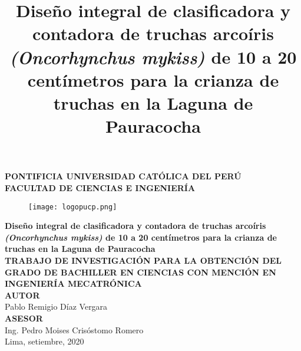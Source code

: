 \clearpage{\pagestyle{empty}\cleardoublepage}
\begin{titlepage}
\begin{center}
 {\Large \bf PONTIFICIA UNIVERSIDAD CATÓLICA DEL PERÚ}\\
  \vspace{0.8 cm} 
  {\Large \bf FACULTAD DE CIENCIAS E INGENIERÍA}\\
  \vspace{1.75 cm}
 \begin{figure}[H]
    \centering
    \texttt{[image: logopucp.png]}
\end{figure}
  \vspace{0.25cm}

\title{Diseño integral de clasificadora y contadora de truchas arcoíris \textit{(Oncorhynchus mykiss)} de 10 a 20 centímetros para la crianza de truchas en la Laguna de Pauracocha} %
{\Large \bf Diseño integral de clasificadora y contadora de truchas arcoíris \textit{(Oncorhynchus mykiss)} de 10 a 20 centímetros para la crianza de truchas en la Laguna de Pauracocha}\\ %
\vspace{0.5cm}
{\Large \bf TRABAJO DE INVESTIGACIÓN PARA LA OBTENCIÓN DEL GRADO DE BACHILLER EN CIENCIAS CON MENCIÓN EN INGENIERÍA MECATRÓNICA}\\[2.0 cm]
{\large \bf AUTOR}\\[0.5cm]
{\large Pablo Remigio Díaz Vergara}\\[1.5 cm] %
{\large \bf ASESOR}\\[0.5 cm] 
{\large Ing. Pedro Moises Crisóstomo Romero}\\[0.5 cm] %
\vspace{1.5 cm}
{\large Lima, setiembre, 2020}

\end{center}
\end{titlepage}